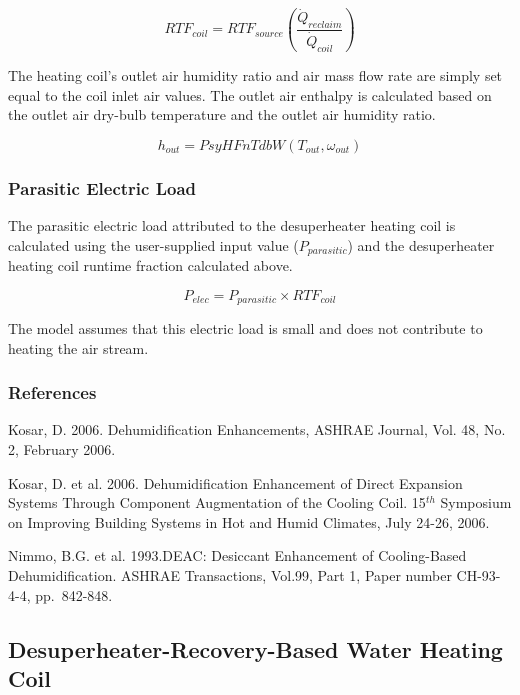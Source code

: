 \begin{equation}
RT{F_{coil}} = RT{F_{source}}\left( {\frac{{{{\dot Q}_{reclaim}}}}{{{{\dot Q}_{coil}}}}} \right)
\end{equation}

The heating coil's outlet air humidity ratio and air mass flow rate are simply set equal to the coil inlet air values. The outlet air enthalpy is calculated based on the outlet air dry-bulb temperature and the outlet air humidity ratio.

\begin{equation}
{h_{out}} = PsyHFnTdbW({T_{out}},{\omega_{out}})
\end{equation}

\subsubsection{Parasitic Electric Load}\label{parasitic-electric-load}

The parasitic electric load attributed to the desuperheater heating coil is calculated using the user-supplied input value (\({P_{parasitic}}\)) and the desuperheater heating coil runtime fraction calculated above.

\begin{equation}
{P_{elec}} = {P_{parasitic}} \times RT{F_{coil}}
\end{equation}

The model assumes that this electric load is small and does not contribute to heating the air stream.

\subsubsection{References}\label{references-7}

Kosar, D. 2006. Dehumidification Enhancements, ASHRAE Journal, Vol. 48, No. 2, February 2006.

Kosar, D. et al. 2006. Dehumidification Enhancement of Direct Expansion Systems Through Component Augmentation of the Cooling Coil. 15\(^{th}\) Symposium on Improving Building Systems in Hot and Humid Climates, July 24-26, 2006.

Nimmo, B.G. et al. 1993.DEAC: Desiccant Enhancement of Cooling-Based Dehumidification. ASHRAE Transactions, Vol.99, Part 1, Paper number CH-93-4-4, pp.~842-848.

\subsection{Desuperheater-Recovery-Based Water Heating Coil}\label{desuperheater-recovery-based-water-heating-coil}


